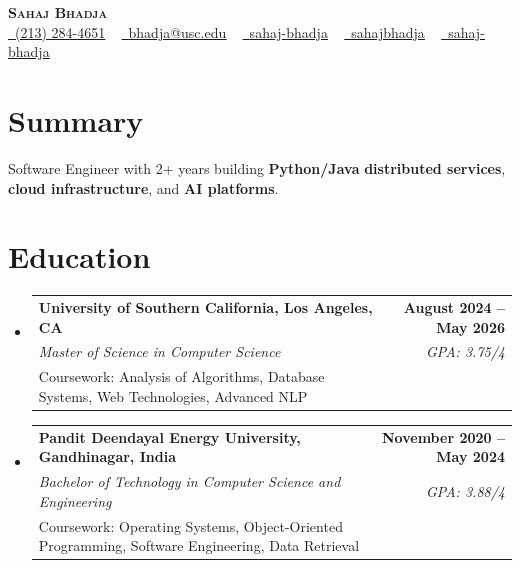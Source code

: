 \documentclass[letterpaper,10pt]{article}
\makeatletter
\newcommand{\sectionGap}{\vspace{-8pt}}
\newcommand{\resumeEduSubheading}[5]{\vspace{-1pt}\item\begin{tabular*}{1.0\textwidth}[t]{l@{\extracolsep{\fill}}r}\textbf{#1} & \textbf{\small #2} \\\textit{\small #3} & \textit{\small #4} \\\small #5 & \\\end{tabular*}\vspace{-4pt}}
\newcommand{\resumeSubHeadingListStart}{\begin{itemize}[leftmargin=0.0in, label={}]}
\newcommand{\resumeSubHeadingListEnd}{\end{itemize}}
\makeatother
\begin{document}
\begin{center}
{\Huge \scshape \textbf{Sahaj Bhadja}} \\ \vspace{1pt}
\small \href{tel:2132844651}{\faPhone\ \underline{(213) 284-4651}} ~ \href{mailto:bhadja@usc.edu}{\raisebox{-0.2\height}\faEnvelope\ \underline{bhadja@usc.edu}} ~
\href{https://www.linkedin.com/in/sahaj-bhadja/}{\raisebox{-0.2\height}\faLinkedin\ \underline{sahaj-bhadja}} ~ \href{https://github.com/SAHAJ-BHADJA}{\raisebox{-0.2\height}\faGithub\ \underline{sahajbhadja}} ~
\href{https://sahaj-bhadja.vercel.app/}{\raisebox{-0.2\height}\faGlobe\ \underline{sahaj-bhadja}}
\end{center}
\vspace{-16pt}
\section{Summary}
\begin{itemize}[leftmargin=0.15in, label={}]
\small{\item{Software Engineer with 2+ years building \textbf{Python/Java} \textbf{distributed services}, \textbf{cloud infrastructure}, and \textbf{AI platforms}.}}
\end{itemize}
\sectionGap
\section{Education}
\resumeSubHeadingListStart
\resumeEduSubheading{University of Southern California, Los Angeles, CA}{August 2024 -- May 2026}{Master of Science in Computer Science}{GPA: 3.75/4}{Coursework: Analysis of Algorithms, Database Systems, Web Technologies, Advanced NLP}
\resumeEduSubheading{Pandit Deendayal Energy University, Gandhinagar, India}{November 2020 -- May 2024}{Bachelor of Technology in Computer Science and Engineering}{GPA: 3.88/4}{Coursework: Operating Systems, Object-Oriented Programming, Software Engineering, Data Retrieval}
\resumeSubHeadingListEnd
\sectionGap
\end{document}
